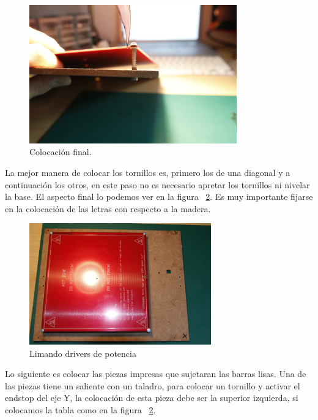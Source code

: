 		    \begin{figure}[H]
		       \centering
		       \includegraphics[width=0.8\textwidth]{../../Fotos/36.jpg}
		       \caption{Colocación final.}
		       \label{fig:colocado.heatbed}
		    \end{figure}
		    \newpage{}
	La mejor manera de colocar los tornillos es, primero los de una diagonal y a continuación los otros, en este paso no es necesario apretar los tornillos ni nivelar la base. El aspecto final lo podemos ver en la figura ~\ref{fig:montada.heatbed}. Es muy importante fijarse en la colocación de las letras con respecto a la madera.\\
		\begin{figure}[H]
			\centering
			\includegraphics[width=0.7\textwidth]{../../Fotos/37.jpg}
			\caption{Limando drivers de potencia}
			\label{fig:montada.heatbed}
		\end{figure}
	Lo siguiente es colocar las piezas impresas que sujetaran las barras lisas. Una de las piezas tiene un saliente con un taladro, para colocar un tornillo y activar el endstop del eje Y, la colocación de esta pieza debe ser la superior izquierda, si colocamos la tabla como en la figura ~\ref{fig:montada.heatbed}.\\
